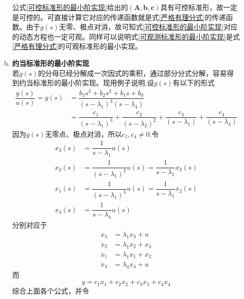 \begin{enumerate}[\hspace*{2em} (1)]
\begin{enumerate}[(a) ]
	\hspace*{2em} 公式\eqref{可控标准形的最小阶实现}给出的$(\bm{A,b,c})$具有可控标准形，故一定是可控的。可直接计算它对应的传递函数就是式\eqref{严格有理分式}的传递函数。由于$g(s)$无零、极点对消，故可知式\eqref{可控标准形的最小阶实现}对应的动态方程也一定可观。同样可以说明式\eqref{可观测标准形的最小阶实现}是式\eqref{严格有理分式}的可观标准形的最小实现。
	
	\item \textbf{约当标准形的最小阶实现}\\
	\hspace*{2em}若$g(s)$的分母已经分解成一次因式的乘积，通过部分分式分解，容易得到约当标准形的最小阶实现。现用例子说明,设$g(s)$有以下的形式
	\begin{equation}
		\begin{aligned}
			\dfrac{y(s)}{u(s)} = g(s) &= \dfrac{b_3s^3 + b_2 s^2 + b_1 s + b_0}{(s-\lambda_1)^3 (s- \lambda_4)}\\[0.5em]
			& = \dfrac{c_1}{(s-\lambda_1)^3} + \dfrac{c_2}{(s-\lambda_2)^2} + \dfrac{c_3}{(s - \lambda_1)} + \dfrac{c_4}{(s - \lambda_4)}
		\end{aligned}
	\end{equation}
	因为$g(s)$无零点、极点对消，所以$c_1,c_4 \neq 0.$令
	\begin{equation}
		\begin{aligned}
			x_3(s) &= \dfrac{1}{s - \lambda_1}u(s)\\[0.5em]
			x_2(s) &= \dfrac{1}{(s - \lambda_1)^2}u(s) = \dfrac{1}{s - \lambda_1}x_3(s)\\[0.5em]
			x_1(s) &= \dfrac{1}{(s- \lambda_1)^3}u(s) = \dfrac{1}{s - \lambda_1}x_2(s)\\[0.5em]
			x_4(s) &= \dfrac{1}{s - \lambda_4}u(s)
		\end{aligned}
	\end{equation}
	分别对应于
	\begin{equation}
		\begin{aligned}
			\dot{x}_3 &= \lambda_1 x_3 + u\\
			\dot{x}_2 &= \lambda_1 x_2 + x_3\\
			\dot{x}_1 &= \lambda_1 x_1 + x_2\\
			\dot{x}_4 &= \lambda_4 x_4 + u
		\end{aligned}
	\end{equation}
	而
	\begin{equation}
		y = c_1x_1 + c_2x_2 + c_3x_3 + c_4x_4
	\end{equation}
	综合上面各个公式，并令
	\begin{equation}

\end{equation}
\end{enumerate}
\end{enumerate}
